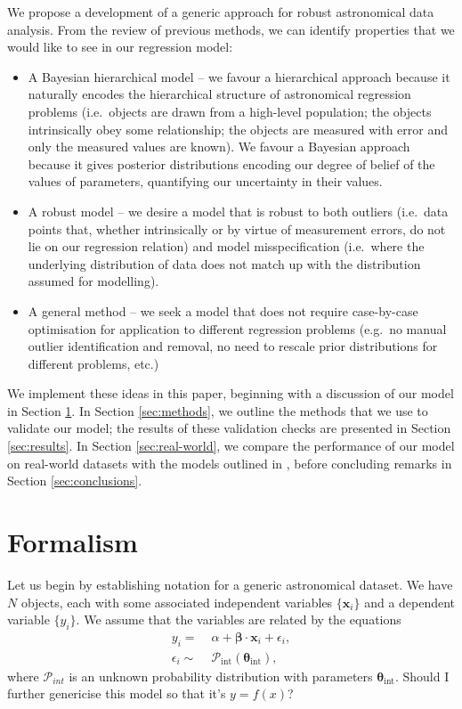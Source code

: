 \documentclass[fleqn,usenatbib]{mnras}
\begin{document}
We propose a development of a generic approach for robust astronomical data
analysis. From the review of previous methods, we can identify properties that
we would like to see in our regression model:

\begin{itemize}
	\item A Bayesian hierarchical model -- we favour a hierarchical approach
	because it naturally encodes the hierarchical structure of astronomical
	regression problems (i.e.\ objects are drawn from a high-level population;
	the objects intrinsically obey some relationship; the objects are measured
	with error and only the measured values are known). We favour a Bayesian
	approach because it gives posterior distributions encoding our degree of
	belief of the values of parameters, quantifying our uncertainty in their
	values.

	\item A robust model -- we desire a model that is robust to both outliers
	(i.e.\ data points that, whether intrinsically or by virtue of measurement
	errors, do not lie on our regression relation) and model misspecification
	(i.e.\ where the underlying distribution of data does not match up with the
	distribution assumed for modelling).

	\item A general method -- we seek a model that does not require case-by-case
	optimisation for application to different regression problems (e.g.\ no
	manual outlier identification and removal, no need to rescale prior
	distributions for different problems, etc.)
\end{itemize}

We implement these ideas in this paper, beginning with a discussion of our model
in Section \ref{sec:formalism}. In Section \ref{sec:methods}, we outline the
methods that we use to validate our model; the results of these validation
checks are presented in Section \ref{sec:results}. In Section
\ref{sec:real-world}, we compare the performance of our model on real-world
datasets with the models outlined in \citet{Kelly:2007, Park:2017}, before
concluding remarks in Section \ref{sec:conclusions}.

\section{Formalism}
\label{sec:formalism}

Let us begin by establishing notation for a generic astronomical dataset. We
have $N$ objects, each with some associated independent variables
$\{\boldsymbol{x}_i\}$ and a dependent variable $\{y_i\}$. We assume that the
variables are related by the equations
\begin{align}
    y_i =&\; \alpha + \boldsymbol{\beta} \cdot \boldsymbol{x}_i + \epsilon_i, \\
    \epsilon_i \sim&\; \mathcal{P}_{\text{int}} \left( \boldsymbol{\theta}_{\text{int}} \right),
\end{align}
where $\mathcal{P}_{int}$ is an unknown probability distribution with parameters
$\boldsymbol{\theta}_{\text{int}}$. {\color{red} Should I further genericise
this model so that it's $y = f(x)$?}
\end{document}
